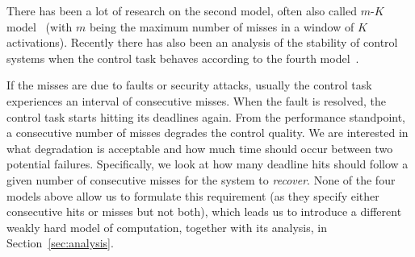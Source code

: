 There has been a lot of research on the second model, often also
called $m$-$K$ model~\cite{Koren:1995, Ramanathan:1997, Soudbakhsh:2013, Bund:2014,
Frehse:2014, Bund:2015, Hammadeh:2017a, Hammadeh:2017b, Sun:2017,
Ahrendts:2018, Soudbakhsh:2018, Pazzaglia:2018, Pazzaglia:2019,
Gaukler:2019a} (with $m$ being the maximum number of misses in a
window of $K$ activations). Recently there has also been an
analysis of the stability of control systems when the control
task behaves according to the fourth model~\cite{Maggio:2020}.

If the misses are due to faults or security attacks, usually the
control task experiences an interval of consecutive misses. When the
fault is resolved, the control task starts hitting its deadlines
again. From the performance standpoint, a consecutive number of
misses degrades the control quality. We are interested in what
degradation is acceptable and how much time should occur between
two potential failures. Specifically, we look at how many deadline
hits should follow a given number of consecutive misses for the
system to \emph{recover}. None of the four models above allow us
to formulate this requirement (as they specify either consecutive 
hits or misses but not both), which leads us to introduce a different
weakly hard model of computation, together with its analysis, in
Section~\ref{sec:analysis}.
